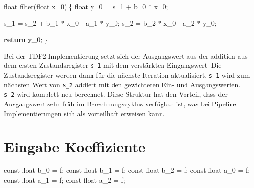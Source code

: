 \documentclass[
  ngerman,
  letterpaper,
  DIV=11]{scrreprt}
\newenvironment{Shaded}{\begin{snugshade}}{\end{snugshade}}
\newcommand{\AttributeTok}[1]{\textcolor[rgb]{0.40,0.45,0.13}{#1}}
\newcommand{\ControlFlowTok}[1]{\textcolor[rgb]{0.00,0.23,0.31}{\textbf{#1}}}
\newcommand{\DataTypeTok}[1]{\textcolor[rgb]{0.68,0.00,0.00}{#1}}
\newcommand{\NormalTok}[1]{\textcolor[rgb]{0.00,0.23,0.31}{#1}}
\newcommand{\OperatorTok}[1]{\textcolor[rgb]{0.37,0.37,0.37}{#1}}
\newcommand{\VariableTok}[1]{\textcolor[rgb]{0.07,0.07,0.07}{#1}}
\begin{document}
\begin{Shaded}
\begin{Highlighting}[]
\DataTypeTok{float}\NormalTok{ filter}\OperatorTok{(}\DataTypeTok{float}\NormalTok{ x\_0}\OperatorTok{)}
\OperatorTok{\{}
  \DataTypeTok{float}\NormalTok{ y\_0 }\OperatorTok{=} \VariableTok{s\_1} \OperatorTok{+}\NormalTok{ b\_0 }\OperatorTok{*}\NormalTok{ x\_0}\OperatorTok{;}

  \VariableTok{s\_1} \OperatorTok{=} \VariableTok{s\_2} \OperatorTok{+}\NormalTok{ b\_1 }\OperatorTok{*}\NormalTok{ x\_0 }\OperatorTok{{-}}\NormalTok{ a\_1 }\OperatorTok{*}\NormalTok{ y\_0}\OperatorTok{;} 
  \VariableTok{s\_2} \OperatorTok{=}\NormalTok{ b\_2 }\OperatorTok{*}\NormalTok{ x\_0 }\OperatorTok{{-}}\NormalTok{ a\_2 }\OperatorTok{*}\NormalTok{ y\_0}\OperatorTok{;}
    
  \ControlFlowTok{return}\NormalTok{ y\_0}\OperatorTok{;}
\OperatorTok{\}}  
\end{Highlighting}
\end{Shaded}

Bei der TDF2 Implementierung setzt sich der Ausgangswert aus der
addition aus dem ersten Zustandsregister \texttt{s\_1} mit dem
verstärkten Eingangswert. Die Zustandsregister werden dann für die
nächste Iteration aktualisiert. \texttt{s\_1} wird zum nächsten Wert von
\texttt{s\_2} addiert mit den gewichteten Ein- und Ausgangswerten.
\texttt{s\_2} wird komplett neu berechnet. Diese Struktur hat den
Vorteil, dass der Ausgangswert sehr früh im Berechnungszyklus verfügbar
ist, was bei Pipeline Implementierungen sich als vorteilhaft erweisen
kann.

\section{Eingabe Koeffiziente}\label{eingabe-koeffiziente}

\begin{Shaded}
\begin{Highlighting}[]
\AttributeTok{const} \DataTypeTok{float}\NormalTok{ b\_0 }\OperatorTok{=}\NormalTok{ f}\OperatorTok{;}
\AttributeTok{const} \DataTypeTok{float}\NormalTok{ b\_1 }\OperatorTok{=}\NormalTok{ f}\OperatorTok{;}
\AttributeTok{const} \DataTypeTok{float}\NormalTok{ b\_2 }\OperatorTok{=}\NormalTok{ f}\OperatorTok{;}
\AttributeTok{const} \DataTypeTok{float}\NormalTok{ a\_0 }\OperatorTok{=}\NormalTok{ f}\OperatorTok{;}
\AttributeTok{const} \DataTypeTok{float}\NormalTok{ a\_1 }\OperatorTok{=}\NormalTok{ f}\OperatorTok{;}
\AttributeTok{const} \DataTypeTok{float}\NormalTok{ a\_2 }\OperatorTok{=}\NormalTok{ f}\OperatorTok{;}
\end{Highlighting}
\end{Shaded}
\end{document}
